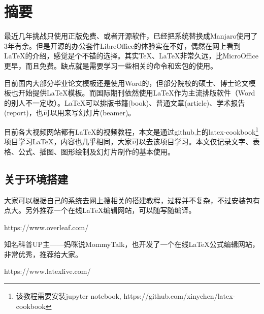 \chapter*{摘要}

最近几年挑战只使用正版免费、或者开源软件，已经把系统替换成Manjaro使用了3年有余。但是开源的办公套件LibreOffice的体验实在不好，偶然在网上看到\LaTeX 的介绍，感觉是个不错的选择。其实TeX、\LaTeX 非常久远，比MicroOffice更早，而且免费。缺点就是需要学习一些相关的命令和宏包的使用。

目前国内大部分毕业论文模板还是使用Word的，但部分院校的硕士、博士论文模板也开始提供\LaTeX 模板。而国际期刊依然使用\LaTeX 作为主流排版软件（Word的别人不一定收）。\LaTeX 可以排版书籍(book)、普通文章(article)、学术报告(report)，也可以用来写幻灯片(beamer)。

目前各大视频网站都有\LaTeX 的视频教程，本文是通过github上的latex-cookbook\footnote{该教程需要安装jupyter notebook, https://github.com/xinychen/latex-cookbook}项目学习\LaTeX ，内容也几乎相同，大家可以去该项目学习。本文仅记录文字、表格、公式、插图、图形绘制及幻灯片制作的基本使用。

\section*{关于环境搭建}

大家可以根据自己的系统去网上搜相关的搭建教程，过程并不复杂，不过安装包有点大。另外推荐一个在线\LaTeX 编辑网站，可以随写随编译。

\begin{tcolorbox}[colback=red!5!white, colframe=red!50!black,
        title=Overleaf\, Online LaTeX Editor]
    https://www.overleaf.com/
\end{tcolorbox}

知名科普UP主——妈咪说MommyTalk，也开发了一个在线\LaTeX 公式编辑网站，非常优秀，推荐给大家。

\begin{tcolorbox}[colback=red!5!white, colframe=red!50!black,
        title=在线LaTeX公式编辑器]
    https://www.latexlive.com/
\end{tcolorbox}